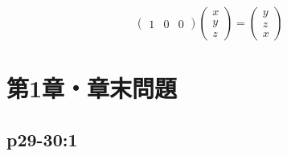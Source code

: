 \documentclass[uplatex,dvipdfmx,a4paper,10pt,fleqn]{jsarticle}
\begin{document}
\begin{tleftbar}
\begin{description}
\[\begin{pmatrix}
                1 & 0 & 0
            \end{pmatrix}
            \begin{pmatrix}
                x \\
                y \\
                z
            \end{pmatrix}
            =\begin{pmatrix}
                y \\
                z \\
                x
            \end{pmatrix}
            \]
        \end{description}
        \end{tleftbar}


        \setcounter{equation}{0}

\section*{第1章・章末問題}


\subsection*{p29-30:1}
\end{document}
